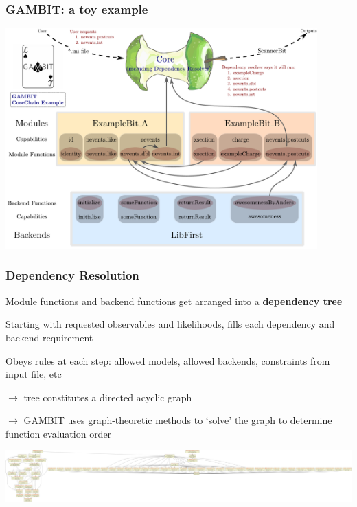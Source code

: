 \documentclass[xcolor=dvipsnames]{beamer}
\begin{document}
\begin{frame}
\frametitle{GAMBIT: a toy example}
\centering
\includegraphics[width=0.9\textwidth]{coreChainDiagram_example_wlogo}	
\end{frame}

\begin{frame}
\frametitle{Dependency Resolution}

{
  \bi
    \item Module functions and backend functions get arranged into a \textbf{dependency tree}
    \item Starting with requested observables and likelihoods, fills each dependency and backend requirement
    \item Obeys rules at each step: allowed models, allowed backends, constraints from input file, etc
    \item $\rightarrow$ tree constitutes a directed acyclic graph
    \item $\rightarrow$ GAMBIT uses graph-theoretic methods to `solve' the graph to determine function evaluation order
  \ei
}

{
  \includegraphics[width=\textwidth]{GAMBIT_active_functor_graph}
}


\end{frame}
\end{document}
